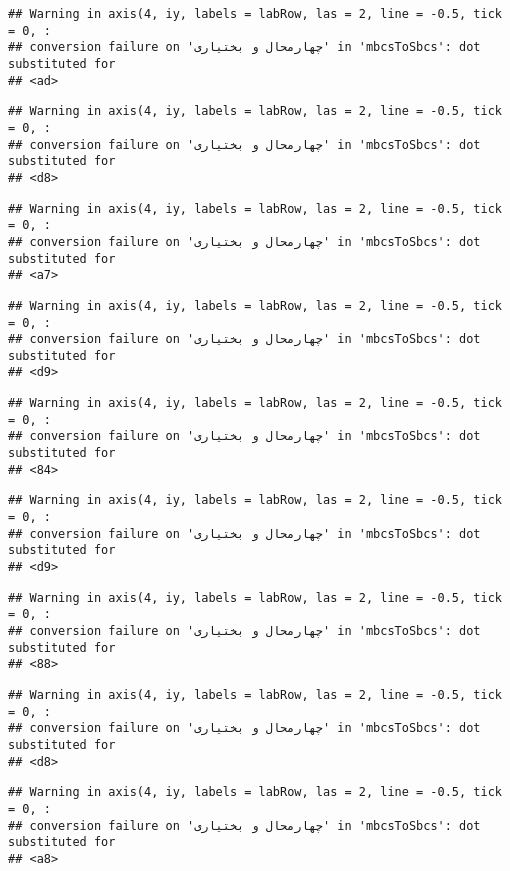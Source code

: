 \documentclass[
]{article}
\begin{document}
\begin{verbatim}
## Warning in axis(4, iy, labels = labRow, las = 2, line = -0.5, tick = 0, :
## conversion failure on 'چهارمحال و بختیاری' in 'mbcsToSbcs': dot substituted for
## <ad>
\end{verbatim}

\begin{verbatim}
## Warning in axis(4, iy, labels = labRow, las = 2, line = -0.5, tick = 0, :
## conversion failure on 'چهارمحال و بختیاری' in 'mbcsToSbcs': dot substituted for
## <d8>
\end{verbatim}

\begin{verbatim}
## Warning in axis(4, iy, labels = labRow, las = 2, line = -0.5, tick = 0, :
## conversion failure on 'چهارمحال و بختیاری' in 'mbcsToSbcs': dot substituted for
## <a7>
\end{verbatim}

\begin{verbatim}
## Warning in axis(4, iy, labels = labRow, las = 2, line = -0.5, tick = 0, :
## conversion failure on 'چهارمحال و بختیاری' in 'mbcsToSbcs': dot substituted for
## <d9>
\end{verbatim}

\begin{verbatim}
## Warning in axis(4, iy, labels = labRow, las = 2, line = -0.5, tick = 0, :
## conversion failure on 'چهارمحال و بختیاری' in 'mbcsToSbcs': dot substituted for
## <84>
\end{verbatim}

\begin{verbatim}
## Warning in axis(4, iy, labels = labRow, las = 2, line = -0.5, tick = 0, :
## conversion failure on 'چهارمحال و بختیاری' in 'mbcsToSbcs': dot substituted for
## <d9>
\end{verbatim}

\begin{verbatim}
## Warning in axis(4, iy, labels = labRow, las = 2, line = -0.5, tick = 0, :
## conversion failure on 'چهارمحال و بختیاری' in 'mbcsToSbcs': dot substituted for
## <88>
\end{verbatim}

\begin{verbatim}
## Warning in axis(4, iy, labels = labRow, las = 2, line = -0.5, tick = 0, :
## conversion failure on 'چهارمحال و بختیاری' in 'mbcsToSbcs': dot substituted for
## <d8>
\end{verbatim}

\begin{verbatim}
## Warning in axis(4, iy, labels = labRow, las = 2, line = -0.5, tick = 0, :
## conversion failure on 'چهارمحال و بختیاری' in 'mbcsToSbcs': dot substituted for
## <a8>
\end{verbatim}
\end{document}
